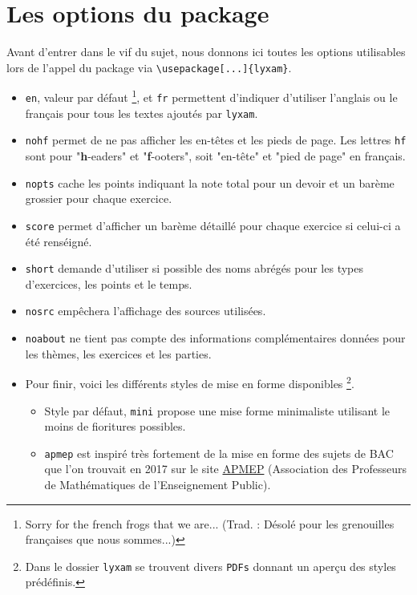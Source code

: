\documentclass[12pt,a4paper]{scrartcl}
\begin{document}
\section{Les options du package}

Avant d'entrer dans le vif du sujet, nous donnons ici toutes les options utilisables lors de l'appel du package via \verb+\usepackage[...]{lyxam}+.

\begin{itemize}
	\item \verb+en+, valeur par défaut
	\footnote{
		Sorry for the french frogs that we are... (Trad. : Désolé pour les grenouilles françaises que nous sommes...)
	}, et \verb+fr+ permettent d'indiquer d'utiliser l'anglais ou le français pour tous les textes ajoutés par \verb+lyxam+.

	\item \verb+nohf+ permet de ne pas afficher les en-têtes et les pieds de page.
	Les lettres \verb+hf+ sont pour "\textbf{h}-eaders" et "\textbf{f}-ooters", soit "en-tête" et "pied de page" en français.

	\item \verb+nopts+ cache les points indiquant la note total pour un devoir et un barème grossier pour chaque exercice.

	\item \verb+score+ permet d'afficher un barème détaillé pour chaque exercice si celui-ci a été renséigné.

	\item \verb+short+ demande d'utiliser si possible des noms abrégés pour les types d'exercices, les points et le temps.

	\item \verb+nosrc+ empêchera l'affichage des sources utilisées.

	\item \verb+noabout+ ne tient pas compte des informations complémentaires données pour les thèmes, les exercices et les parties.

	\item Pour finir, voici les différents styles de mise en forme disponibles
	\footnote{
		Dans le dossier \texttt{lyxam} se trouvent divers \texttt{PDFs} donnant un aperçu des styles prédéfinis.
	}.
	\begin{itemize}[label=--]
        \item Style par défaut, \verb+mini+ propose une mise forme minimaliste utilisant le moins de fioritures possibles.
        
        \item \verb+apmep+ est inspiré très fortement de la mise en forme des sujets de BAC que l'on trouvait en 2017 sur le site \href{https://www.apmep.fr}{APMEP} (Association des Professeurs de Mathématiques de l'Enseignement Public).
        

\end{itemize}
\end{itemize}
\end{document}
